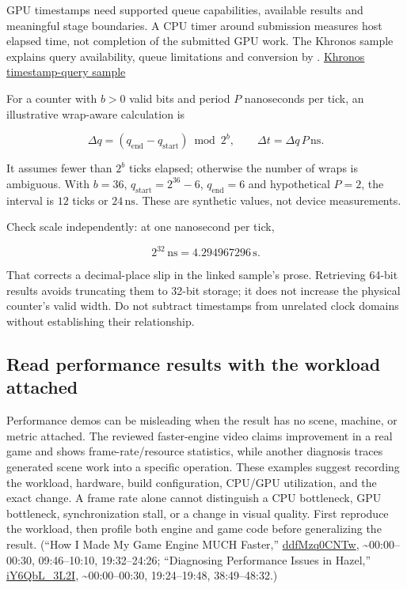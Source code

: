\hypertarget{06-engine-ii-ch041-convert-gpu-timestamps-with-their-own-clock-contract}{}

GPU timestamps need supported queue capabilities, available results and meaningful stage boundaries. A CPU timer around submission measures host elapsed time, not completion of the submitted GPU work. The Khronos sample explains query availability, queue limitations and conversion by . \href{https://docs.vulkan.org/samples/latest/samples/api/timestamp_queries/README.html}{Khronos timestamp-query sample}

For a counter with \(b>0\) valid bits and period \(P\) nanoseconds per tick, an illustrative wrap-aware calculation is

\[
\Delta q=(q_{\mathrm{end}}-q_{\mathrm{start}})\bmod2^b,
\qquad
\Delta t=\Delta q\,P\,\mathrm{ns}.
\]

It assumes fewer than \(2^b\) ticks elapsed; otherwise the number of wraps is ambiguous. With \(b=36\), \(q_{\mathrm{start}}=2^{36}-6\), \(q_{\mathrm{end}}=6\) and hypothetical \(P=2\), the interval is \(12\) ticks or \(24\,\mathrm{ns}\). These are synthetic values, not device measurements.

Check scale independently: at one nanosecond per tick,

\[2^{32}\,\mathrm{ns}=4.294967296\,\mathrm{s}.\]

That corrects a decimal-place slip in the linked sample's prose. Retrieving 64-bit results avoids truncating them to 32-bit storage; it does not increase the physical counter's valid width. Do not subtract timestamps from unrelated clock domains without establishing their relationship.

\subsection{Read performance results with the workload attached}\label{06-engine-ii-ch041-read-performance-results-with-the-workload-attached}

\hypertarget{06-engine-ii-ch041-read-performance-results-with-the-workload-attached}{}

Performance demos can be misleading when the result has no scene, machine, or metric attached. The reviewed faster-engine video claims improvement in a real game and shows frame-rate/resource statistics, while another diagnosis traces generated scene work into a specific operation. These examples suggest recording the workload, hardware, build configuration, CPU/GPU utilization, and the exact change. A frame rate alone cannot distinguish a CPU bottleneck, GPU bottleneck, synchronization stall, or a change in visual quality. First reproduce the workload, then profile both engine and game code before generalizing the result. (``How I Made My Game Engine MUCH Faster,'' \href{https://www.youtube.com/watch?v=ddfMzq0CNTw}{ddfMzq0CNTw}, \textasciitilde00:00--00:30, 09:46--10:10, 19:32--24:26; ``Diagnosing Performance Issues in Hazel,'' \href{https://www.youtube.com/watch?v=iY6QbL_3L2I}{iY6QbL\_3L2I}, \textasciitilde00:00--00:30, 19:24--19:48, 38:49--48:32.)

